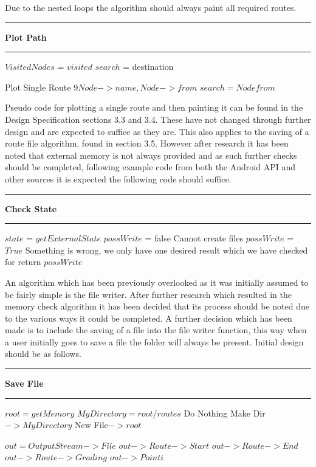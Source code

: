 Due to the nested loops the algorithm should always paint all required routes. 
\vspace{0.3cm}
\hrule
\vspace{0.1cm}
\textbf{Plot Path}
\vspace{0.1cm}
\hrule
\vspace{0.1cm}
\begin{algorithmic}[1]
\State $Visited Nodes$ = $visited$
\State$search$ = destination
	
		\State Plot Single Route 9$Node->name, Node->from$
		\State $search = Node from$
	\EndIf
\EndFor
\EndFor
\end{algorithmic}
Pseudo code for plotting a single route and then painting it can be found in the Design Specification sections 3.3 and 3.4. These have not changed through further design and are expected to suffice as they are. This also applies to the saving of a route file algorithm, found in section 3.5. However after research it has been noted that external memory is not always provided and as such further checks should be completed\cite{storage}, following example code from both the Android API and other sources\cite{check} it is expected the following code should suffice. 
\vspace{0.3cm}
\hrule
\vspace{0.1cm}
\textbf{Check State}
\vspace{0.1cm}
\hrule
\vspace{0.1cm}
\begin{algorithmic}[1]
\State $state$ = $getExternalState$
\State $possWrite$ = false
	\State Cannot create files
	\State $possWrite$ = $True$
\Else{}
	\State Something is wrong, we only have one desired result which we have checked for
	\EndIf
	\State return $possWrite$

\end{algorithmic}
An algorithm which has been previously overlooked as it was initially assumed to be fairly simple is the file writer. After further research which resulted in the memory check algorithm\cite{check} it has been decided that its process should be noted due to the various ways it could be completed. A further decision which has been made is to include the saving of a file into the file writer function, this way when a user initially goes to save a file the folder will always be present. Initial design should be as follows. 
\vspace{0.3cm}
\hrule
\vspace{0.2cm}
\textbf{Save File}
\vspace{0.1cm}
\hrule
\vspace{0.1cm}
\begin{algorithmic}[1]
\State $root = get Memory$
\State $My Directory = root/routes$
	\State Do Nothing
	\Else
\State Make Dir $->My Directory$
\EndIf
\State New File$-> root$

\State $out = Output Stream -> File$
\State $out -> Route ->Start$
\State $out -> Route -> End$
\State $out -> Route -> Grading$
	\State $out -> Point i$
\EndFor

\end{algorithmic}
